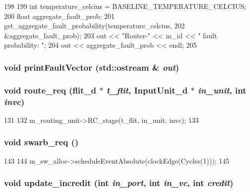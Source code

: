 \begin{DoxyCode}
198 {
199     int temperature_celcius = BASELINE_TEMPERATURE_CELCIUS;
200     float aggregate_fault_prob;
201     get_aggregate_fault_probability(temperature_celcius,
202                                     &aggregate_fault_prob);
203     out << "Router-" << m_id << " fault probability: ";
204     out << aggregate_fault_prob << endl;
205 }
\end{DoxyCode}
\hypertarget{classRouter__d_a662a706b4bf7b0d3775e5f8faea92887}{
\subsubsection[{printFaultVector}]{\setlength{\rightskip}{0pt plus 5cm}void printFaultVector (std::ostream \& {\em out})}}
\label{classRouter__d_a662a706b4bf7b0d3775e5f8faea92887}
\hypertarget{classRouter__d_ace403705bf919b1d73f46d5862041eb9}{
\subsubsection[{route\_\-req}]{\setlength{\rightskip}{0pt plus 5cm}void route\_\-req ({\bf flit\_\-d} $\ast$ {\em t\_\-flit}, \/  {\bf InputUnit\_\-d} $\ast$ {\em in\_\-unit}, \/  int {\em invc})}}
\label{classRouter__d_ace403705bf919b1d73f46d5862041eb9}



\begin{DoxyCode}
131 {
132     m_routing_unit->RC_stage(t_flit, in_unit, invc);
133 }
\end{DoxyCode}
\hypertarget{classRouter__d_a62f4a4369808a4f33896a2cc80b277d5}{
\subsubsection[{swarb\_\-req}]{\setlength{\rightskip}{0pt plus 5cm}void swarb\_\-req ()}}
\label{classRouter__d_a62f4a4369808a4f33896a2cc80b277d5}



\begin{DoxyCode}
143 {
144     m_sw_alloc->scheduleEventAbsolute(clockEdge(Cycles(1)));
145 }
\end{DoxyCode}
\hypertarget{classRouter__d_af313fde0adb2572f30073cff674722d8}{
\subsubsection[{update\_\-incredit}]{\setlength{\rightskip}{0pt plus 5cm}void update\_\-incredit (int {\em in\_\-port}, \/  int {\em in\_\-vc}, \/  int {\em credit})}}
\label{classRouter__d_af313fde0adb2572f30073cff674722d8}



